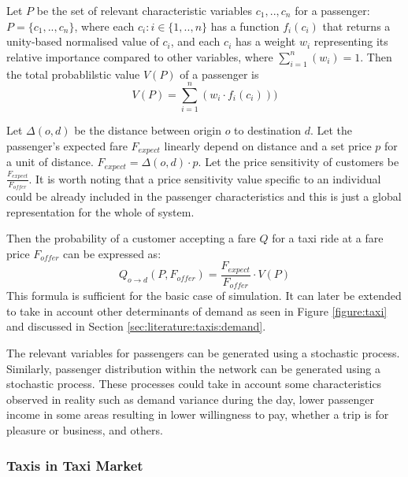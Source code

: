 Let \(P\) be the set of relevant characteristic variables \(c_1,..,c_n\) for a
passenger: \(P = \{c_1,..,c_n\}\), \newline
where each \(c_i : i \in \{1, .., n\}\) has a function \(f_i (c_i) \) that
returns a unity-based normalised value of \(c_i\), \newline
and each \(c_i\) has a weight \(w_i\) representing its relative importance
compared to other variables, where \(\sum_{i=1}^n (w_i) = 1 \). \newline
Then the total probablilstic value \(V(P)\) of a passenger is \[ V(P) =
\sum_{i=1}^{n} (w_i \cdot f_i(c_i) )) \] \newline

Let \(\Delta(o,d)\) be the distance between origin \(o\) to destination \(d\). 
\newline
Let the passenger's expected fare \(F_{expect}\) linearly depend on distance
and a set price \(p\) for a unit of distance. \(F_{expect} = \Delta(o,d) \cdot
p \). \newline
Let the price sensitivity of customers be \(\frac{F_{expect}}{F_{offer}}\). It
is worth noting that a price sensitivity value specific to an individual could
be already included in the passenger characteristics and this is just a global
representation for the whole of system. \newline

Then the probability of a customer accepting a fare \(Q\) for a taxi ride at a
fare price \(F_{offer}\) can be expressed as: 
\begin{equation} 
  \label{eq:requirements:demand}
  Q_{o \rightarrow d} (P,F_{offer}) = \frac{F_{expect}}{F_{offer}} \cdot V(P)
\end{equation}
This formula is sufficient for the basic case of simulation. It can later be
extended to take in account other determinants of demand as seen in Figure
\ref{figure:taxi} and discussed in Section \ref{sec:literature:taxis:demand}.

The relevant variables for passengers can be generated using a stochastic
process. Similarly, passenger distribution within the network can be generated
using a stochastic process. These processes could take in account some
characteristics observed in reality such as demand variance during the day,
lower passenger income in some areas resulting in lower willingness to pay,
whether a trip is for pleasure or business, and others.


\subsubsection{Taxis in Taxi Market}
\label{sec:requirements:taxi}

